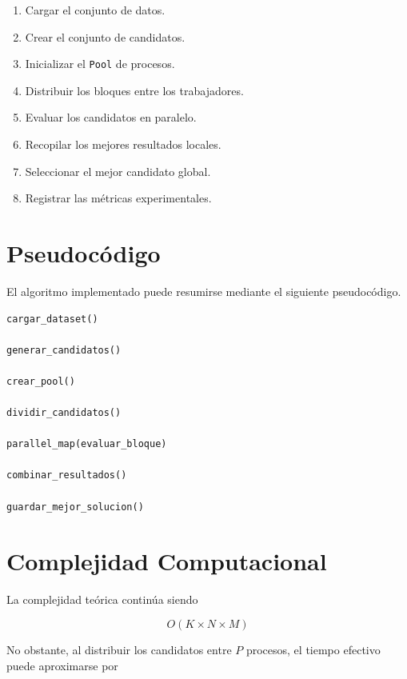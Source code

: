 \begin{enumerate}

\item Cargar el conjunto de datos.

\item Crear el conjunto de candidatos.

\item Inicializar el \texttt{Pool} de procesos.

\item Distribuir los bloques entre los trabajadores.

\item Evaluar los candidatos en paralelo.

\item Recopilar los mejores resultados locales.

\item Seleccionar el mejor candidato global.

\item Registrar las métricas experimentales.

\end{enumerate}

\section{Pseudocódigo}

El algoritmo implementado puede resumirse mediante el siguiente pseudocódigo.

\begin{lstlisting}
cargar_dataset()

generar_candidatos()

crear_pool()

dividir_candidatos()

parallel_map(evaluar_bloque)

combinar_resultados()

guardar_mejor_solucion()
\end{lstlisting}

\section{Complejidad Computacional}

La complejidad teórica continúa siendo

\[
O(K \times N \times M)
\]

No obstante, al distribuir los candidatos entre \(P\) procesos, el tiempo efectivo puede aproximarse por

